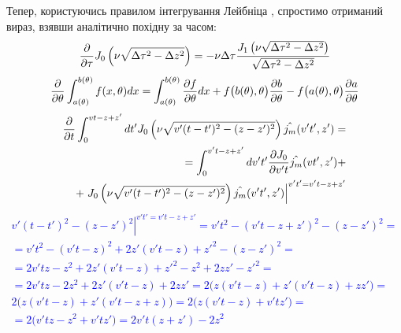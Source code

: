 Тепер, користуючись правилом інтегрування Лейбніца \cite{imp:NumRecipes2007}, 
спростимо отриманий вираз, взявши аналітично похідну за часом:
%
\textcolor{blue} { \begin{equation*} \begin{aligned}
\frac{\partial }{\partial \tau} 
J_0 \left( \nu \sqrt{\Delta \tau^2 - \Delta z^2} \right) = 
- \nu \Delta \tau 
\frac{J_1 \left( \nu \sqrt{\Delta \tau^2 - \Delta z^2} \right)}
{\sqrt{\Delta \tau^2 - \Delta z^2}}
\end{aligned} \end{equation*} }
%
\textcolor{blue} { \begin{equation*} \begin{aligned}
\frac{\partial }{\partial \theta} \int_{a(\theta)}^{b(\theta)} f(x,\theta) dx = 
\int_{a(\theta)}^{b(\theta)} \frac{\partial f}{\partial \theta} dx + 
f\big( b(\theta), \theta \big) \frac{\partial b}{\partial \theta} -
f\big( a(\theta), \theta \big) \frac{\partial a}{\partial \theta}
\end{aligned} \end{equation*} }
%
\textcolor{blue} { \begin{equation*} \begin{aligned}
\frac{\partial }{\partial t} \int_0^{vt - z + z'} dt'
J_0 \left( \nu \sqrt{v'(t-t')^2 - (z-z')^2} \right) \hat{j_m} (v't',z') = \\
= \int_0^{v't - z + z'} dv't' \frac{\partial J_0}{\partial v't} \hat{j_m} (vt',z') + \\
+ \left. 
J_0 \left( \nu \sqrt{v'(t-t')^2 - (z-z')^2} \right) \hat{j_m} (v't',z')
\right|^{v't' = v't - z + z'}
\end{aligned} \end{equation*} }
%
\textcolor{blue} { \begin{equation*} \begin{aligned}
\left. v'(t-t')^2 - (z-z')^2 \right|^{v't' = v't - z + z'} = 
v't^2 - (v't - z + z')^2 - (z-z')^2 = \\
= v't^2 - (v't - z)^2 + 2 z' (v't - z) + z'^2 - (z-z')^2 = \\
= 2 v't z - z^2 + 2 z' (v't - z) + z'^2 - z^2 + 2 z z' - z'^2 = \\
= 2 v't z - 2 z^2 + 2 z' (v't - z) + 2 z z' = 
2 \big( z (v't - z) + z' (v't - z) + z z' \big) = \\
2 \big( z (v't - z) + z' (v't - z + z) \big) = 
2 \big( z (v't - z) + v't z' \big) = \\
= 2 \big( v't z - z^2 + v't z' \big) = 2 v't (z + z') - 2 z^2
\end{aligned} \end{equation*} }
